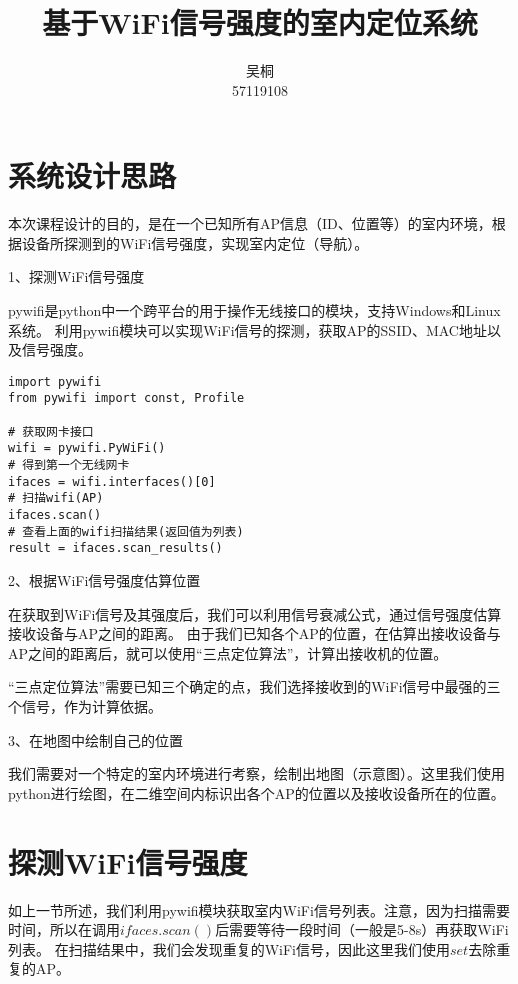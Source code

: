 \documentclass{article}
\title{基于WiFi信号强度的室内定位系统}
\author{吴桐\\57119108}
\begin{document}
\maketitle





\section{系统设计思路}

本次课程设计的目的，是在一个已知所有AP信息（ID、位置等）的室内环境，根据设备所探测到的WiFi信号强度，实现室内定位（导航）。

1、探测WiFi信号强度

pywifi是python中一个跨平台的用于操作无线接口的模块，支持Windows和Linux系统。
利用pywifi模块可以实现WiFi信号的探测，获取AP的SSID、MAC地址以及信号强度。

\begin{verbatim}
import pywifi
from pywifi import const, Profile

# 获取网卡接口
wifi = pywifi.PyWiFi() 
# 得到第一个无线网卡
ifaces = wifi.interfaces()[0]
# 扫描wifi(AP)
ifaces.scan()
# 查看上面的wifi扫描结果(返回值为列表)
result = ifaces.scan_results()
\end{verbatim}

2、根据WiFi信号强度估算位置

在获取到WiFi信号及其强度后，我们可以利用信号衰减公式，通过信号强度估算接收设备与AP之间的距离。
由于我们已知各个AP的位置，在估算出接收设备与AP之间的距离后，就可以使用“三点定位算法”，计算出接收机的位置。

“三点定位算法”需要已知三个确定的点，我们选择接收到的WiFi信号中最强的三个信号，作为计算依据。

3、在地图中绘制自己的位置

我们需要对一个特定的室内环境进行考察，绘制出地图（示意图）。这里我们使用python进行绘图，在二维空间内标识出各个AP的位置以及接收设备所在的位置。
   
\section{探测WiFi信号强度}

如上一节所述，我们利用pywifi模块获取室内WiFi信号列表。注意，因为扫描需要时间，所以在调用$ifaces.scan()$后需要等待一段时间（一般是5-8s）再获取WiFi列表。
在扫描结果中，我们会发现重复的WiFi信号，因此这里我们使用$set$去除重复的AP。
\end{document}

